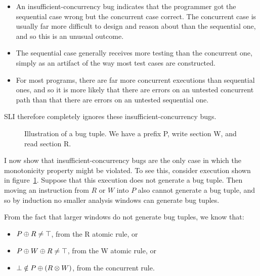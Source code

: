 \begin{itemize}
\item
  An insufficient-concurrency bug indicates that the programmer got
  the sequential case wrong but the concurrent case correct.  The
  concurrent case is usually far more difficult to design and reason
  about than the sequential one, and so this is an unusual
  outcome\needCite{}.
\item
  The sequential case generally receives more testing than the
  concurrent one, simply as an artifact of the way most test cases are
  constructed\needCite{}.
\item
  For most programs, there are far more concurrent executions than
  sequential ones, and so it is more likely that there are errors on
  an untested concurrent path than that there are errors on an
  untested sequential one.
\end{itemize}

SLI therefore completely ignores these insufficient-concurrency bugs.


\begin{figure}
Illustration of a bug tuple.  We have a prefix P, write section W, and read section R.
\label{fig:mandatory_concurrency3}
\end{figure}

I now show that insufficient-concurrency bugs are the only case in
which the monotonicity property might be violated.  To see this,
consider execution shown in figure~\ref{fig:mandatory_concurrency3}.
Suppose that this execution does not generate a bug tuple.  Then
moving an instruction from $R$ or $W$ into $P$ also cannot generate a
bug tuple, and so by induction no smaller analysis windows can
generate bug tuples.

From the fact that larger windows do not generate bug tuples, we know
that:

\begin{itemize}
\item $P \oplus R \not= \top$, from the R atomic rule, or
\item $P \oplus W \oplus R \not= \top$, from the W atomic rule, or
\item $\bot \notin P \oplus (R \otimes W)$, from the concurrent rule.
\end{itemize}

